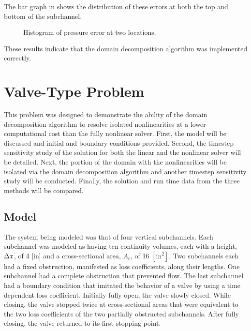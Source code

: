 The bar graph in  shows the distribution of these errors at both the top and bottom of the subchannel.

\begin{figure}[h!tb]
\centering

\caption{Histogram of pressure error at two locations.}
\label{fig:complexBar}
\end{figure}

These results indicate that the domain decomposition algorithm was implemented correctly.

\section{Valve-Type Problem}
\label{sect:valveProblem}

This problem was designed to demonstrate the ability of the domain decomposition algorithm to resolve isolated nonlinearities at a lower computational cost than the fully nonlinear solver. 
First, the model will be discussed and initial and boundary conditions provided.
Second, the timestep sensitivity study of the solution for both the linear and the nonlinear solver will be detailed.
Next, the portion of the domain with the nonlinearities will be isolated via the domain decomposition algorithm and another timestep sensitivity study will be conducted.
Finally, the solution and run time data from the three methods will be compared.

\subsection{Model}
\label{subsect:valveModel}

The system being modeled was that of four vertical subchannels.
Each subchannel was modeled as having ten continuity volumes, each with a height, $\dx{}$, of 4 [in] and a cross-sectional area, $ A_{c} $, of 16 $[\text{in}^{2}]$.
Two subchannels each had a fixed obstruction, manifested as loss coefficients, along their lengths.
One subchannel had a complete obstruction that prevented flow.
The last subchannel had a boundary condition that imitated the behavior of a valve by using a time dependent loss coefficient.
Initially fully open, the valve slowly closed.
While closing, the valve stopped twice at cross-sectional areas that were equivalent to the two loss coefficients of the two partially obstructed subchannels.
After fully closing, the valve returned to its first stopping point.

